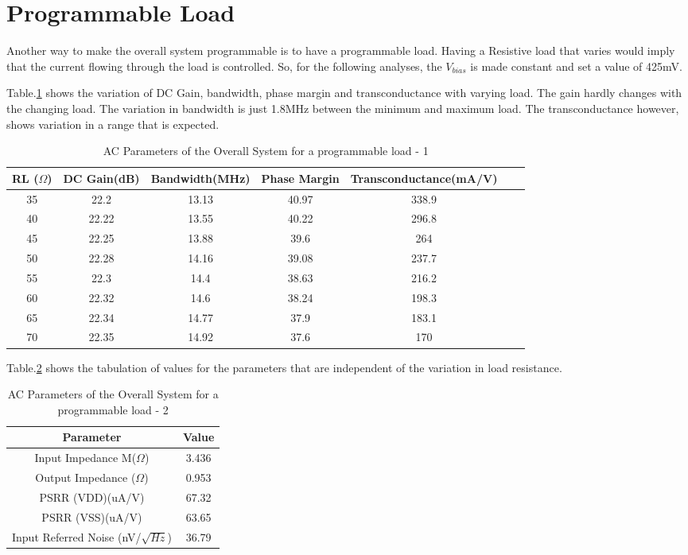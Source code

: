 \section{Programmable Load}
Another way to make the overall system programmable is to have a programmable load. Having a Resistive load that varies would imply that the current flowing through the load is controlled. So, for the following analyses, the $V_{bias}$ is made constant and set a value of 425mV.

Table.\ref{tab:RL_AC_1} shows the variation of DC Gain, bandwidth, phase margin and transconductance with varying load. The gain hardly changes with the changing load. The variation in bandwidth is just 1.8MHz between the minimum and maximum load. The transconductance however, shows variation in a range that is expected.
 
\begin{table} [H]
\centering
\begin{tabular}{@{}ccccccc@{}}
\toprule
RL ($\Omega$)		& DC Gain(dB)		& Bandwidth(MHz)		& Phase Margin			& Transconductance(mA/V)\\ \midrule
35		& 22.2 		& 13.13		& 40.97		& 338.9		\\
40		& 22.22 	& 13.55		& 40.22		& 296.8		\\
45		& 22.25 	& 13.88		& 39.6		& 264		\\
50		& 22.28 	& 14.16		& 39.08		& 237.7		\\
55		& 22.3 		& 14.4		& 38.63		& 216.2		\\
60		& 22.32 	& 14.6		& 38.24		& 198.3		\\
65		& 22.34 	& 14.77		& 37.9	 	& 183.1		\\
70		& 22.35 	& 14.92		& 37.6		& 170		\\
\bottomrule
\end{tabular}
\caption{AC Parameters of the Overall System for a programmable load - 1}
\label{tab:RL_AC_1}
\end{table}

Table.\ref{tab:RL_AC_2} shows the tabulation of values for the parameters that are independent of the variation in load resistance.

\begin{table} [H]
\centering
\begin{tabular}{@{}cc@{}}
\toprule
Parameter							& Value		\\ \midrule
Input Impedance M($\Omega$)			& 3.436 	\\
Output Impedance ($\Omega$)			& 0.953 	\\
PSRR (VDD)(uA/V)					& 67.32 	\\
PSRR (VSS)(uA/V)					& 63.65 	\\
Input Referred Noise (nV/$\sqrt{Hz}$)	& 36.79		\\
\bottomrule
\end{tabular}
\caption{AC Parameters of the Overall System for a programmable load - 2}
\label{tab:RL_AC_2}
\end{table}

